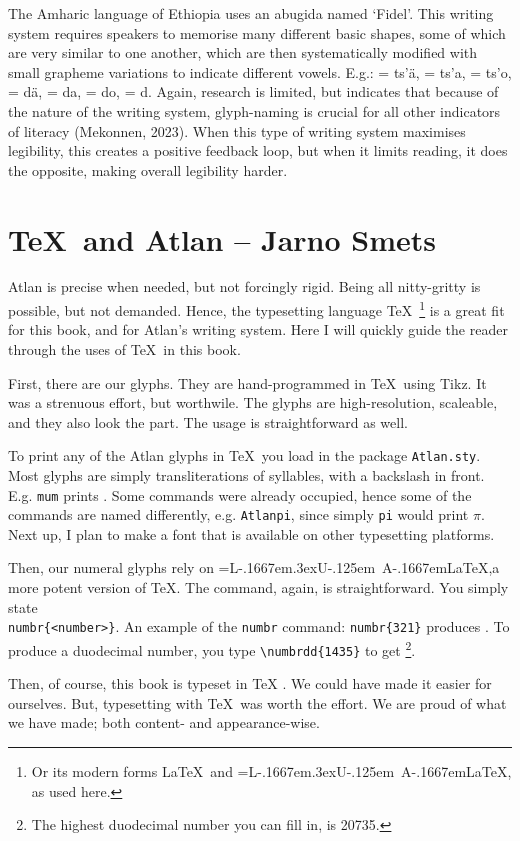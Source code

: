 The Amharic language of Ethiopia uses an abugida named ‘Fidel’. This writing system requires speakers to memorise many different basic shapes, some of which are very similar to one another, which are then systematically modified with small grapheme variations to indicate different vowels. E.g.:  = ts’\"{a},  = ts’a,  = ts’o,  = d\"{a},  = da,  = do,  = d. Again, research is limited, but indicates that because of the nature of the writing system, glyph-naming is crucial for all other indicators of literacy (Mekonnen, 2023). When this type of writing system maximises legibility, this creates a positive feedback loop, but when it limits reading, it does the opposite, making overall legibility harder.  

\def\Lua{\setbox2=\hbox{L\kern-.1667em\lower.3ex\hbox{U}\kern-.125em A}\box2}
\def\LuaLaTeX{{\fontfamily{cmr}\selectfont \Lua\kern-.1667em\LaTeX}}
\section{\TeX{}\ and Atlan -- {\small Jarno Smets}}
Atlan is precise when needed, but not forcingly rigid. Being all nitty-gritty is possible, but not demanded. Hence, the typesetting language \TeX{}\ \footnote{Or its modern forms \LaTeX\ and \LuaLaTeX, as used here.} is a great fit for this book, and for Atlan's writing system. Here I will quickly guide the reader through the uses of \TeX{}\ in this book.

First, there are our glyphs. They are hand-programmed in \TeX{}\ using Tikz. It was a strenuous effort, but worthwile. The glyphs are high-resolution, scaleable, and they also look the part. The usage is straightforward as well. 

To print any of the Atlan glyphs in \TeX{}\, you load in the package {\tt Atlan.sty}. Most glyphs are simply transliterations of syllables, with a backslash in front. E.g. \texttt{mum} prints \mum. Some commands were already occupied, hence some of the commands are named differently, e.g. \texttt{Atlanpi}, since simply \texttt{pi} would print $\pi$. Next up, I plan to make a font that is available on other typesetting platforms. 

Then, our numeral glyphs rely on \LuaLaTeX ,a more potent version of \TeX{}. The command, again, is straightforward. You simply state \texttt{\\numbr\{<number>\footnotemark\}}.   An example of the {\tt numbr} command: \texttt{numbr\{321\}} produces . To produce a duodecimal number, you type \verb|\numbrdd{1435}| to get \footnote{The highest duodecimal number you can fill in, is 20735.}. 



Then, of course, this book is typeset in \TeX{} . We could have made it easier for ourselves. But, typesetting with \TeX{}\ was worth the effort. We are proud of what we have made; both content- and appearance-wise.    


\vfill
